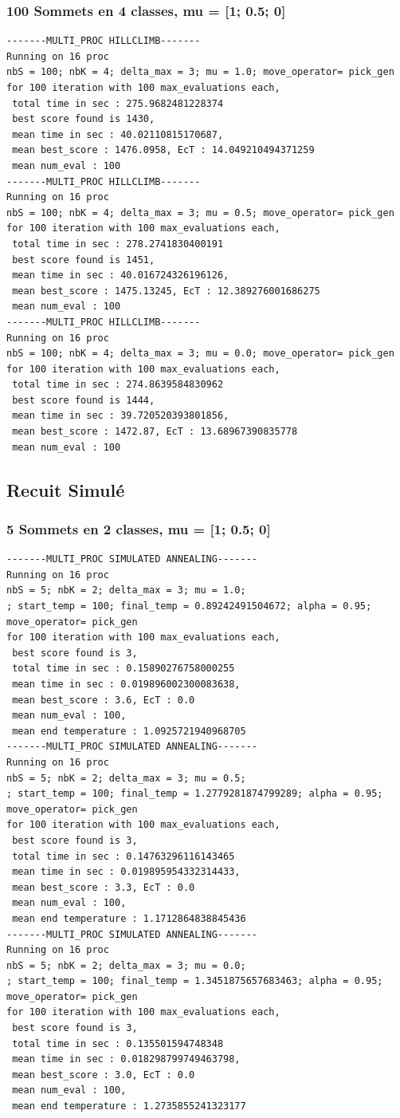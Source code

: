 \documentclass[a4paper]{article}
\begin{document}
\subsubsection{100 Sommets en 4 classes, mu = [1; 0.5; 0]}
\begin{verbatim}
-------MULTI_PROC HILLCLIMB-------
Running on 16 proc
nbS = 100; nbK = 4; delta_max = 3; mu = 1.0; move_operator= pick_gen
for 100 iteration with 100 max_evaluations each, 
 total time in sec : 275.9682481228374
 best score found is 1430,
 mean time in sec : 40.02110815170687,
 mean best_score : 1476.0958, EcT : 14.049210494371259
 mean num_eval : 100
-------MULTI_PROC HILLCLIMB-------
Running on 16 proc
nbS = 100; nbK = 4; delta_max = 3; mu = 0.5; move_operator= pick_gen
for 100 iteration with 100 max_evaluations each, 
 total time in sec : 278.2741830400191
 best score found is 1451,
 mean time in sec : 40.016724326196126,
 mean best_score : 1475.13245, EcT : 12.389276001686275
 mean num_eval : 100
-------MULTI_PROC HILLCLIMB-------
Running on 16 proc
nbS = 100; nbK = 4; delta_max = 3; mu = 0.0; move_operator= pick_gen
for 100 iteration with 100 max_evaluations each, 
 total time in sec : 274.8639584830962
 best score found is 1444,
 mean time in sec : 39.720520393801856,
 mean best_score : 1472.87, EcT : 13.68967390835778
 mean num_eval : 100
\end{verbatim}

\subsection{Recuit Simulé}
\subsubsection{5 Sommets en 2 classes, mu = [1; 0.5; 0]}
\begin{verbatim}
-------MULTI_PROC SIMULATED ANNEALING-------
Running on 16 proc
nbS = 5; nbK = 2; delta_max = 3; mu = 1.0;
; start_temp = 100; final_temp = 0.89242491504672; alpha = 0.95; move_operator= pick_gen
for 100 iteration with 100 max_evaluations each, 
 best score found is 3,
 total time in sec : 0.15890276758000255
 mean time in sec : 0.019896002300083638,
 mean best_score : 3.6, EcT : 0.0
 mean num_eval : 100,
 mean end temperature : 1.0925721940968705
-------MULTI_PROC SIMULATED ANNEALING-------
Running on 16 proc
nbS = 5; nbK = 2; delta_max = 3; mu = 0.5;
; start_temp = 100; final_temp = 1.2779281874799289; alpha = 0.95; move_operator= pick_gen
for 100 iteration with 100 max_evaluations each, 
 best score found is 3,
 total time in sec : 0.14763296116143465
 mean time in sec : 0.019895954332314433,
 mean best_score : 3.3, EcT : 0.0
 mean num_eval : 100,
 mean end temperature : 1.1712864838845436
-------MULTI_PROC SIMULATED ANNEALING-------
Running on 16 proc
nbS = 5; nbK = 2; delta_max = 3; mu = 0.0;
; start_temp = 100; final_temp = 1.3451875657683463; alpha = 0.95; move_operator= pick_gen
for 100 iteration with 100 max_evaluations each, 
 best score found is 3,
 total time in sec : 0.135501594748348
 mean time in sec : 0.018298799749463798,
 mean best_score : 3.0, EcT : 0.0
 mean num_eval : 100,
 mean end temperature : 1.2735855241323177
\end{verbatim}
\end{document}
